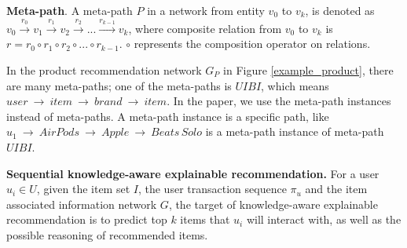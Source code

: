 \begin{definition}
	\textbf{Meta-path}. A meta-path \cite{sun2011pathsim} $P$ in a network from entity $v_0$ to $v_k$, is denoted as $v_0\stackrel{r_0}{\longrightarrow}v_1\stackrel{r_1}{\longrightarrow}v_2\stackrel{r_2}{\longrightarrow}...\stackrel{r_{k-1}}{\longrightarrow}v_k$, where composite relation from $v_0$ to $v_k$ is $r=r_0 \circ r_1\circ r_2\circ ...\circ r_{k-1}$. $\circ$ represents the composition operator on relations.
\end{definition}
\begin{example}
	In the product recommendation network $G_P$ in Figure \ref{example_product}, there are many meta-paths; one of the meta-paths is $UIBI$, which means $user \ {\rightarrow} \ item \ {\rightarrow} \ brand \ {\rightarrow} \ item$. In the paper, we use the meta-path instances instead of meta-paths. A meta-path instance is a specific path, like $u_1 \ {\rightarrow} \ AirPods \ {\rightarrow} \ Apple \ {\rightarrow} \ Beats\,Solo$ is a meta-path instance of meta-path $UIBI$.
\end{example}

\begin{problem}\textbf{Sequential knowledge-aware explainable recommendation.} For a user $u_i \in U$, given the item set $I$, the user transaction sequence $\pi_u$ and the item associated information network $G$, the target of knowledge-aware explainable recommendation is to predict top $k$ items that $u_i$ will interact with, as well as the possible reasoning of recommended items. 
\end{problem}



